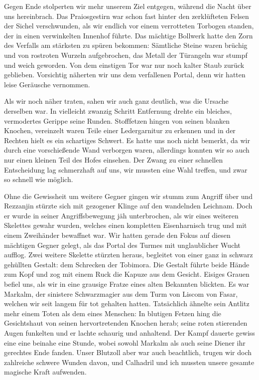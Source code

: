 Gegen Ende stolperten wir mehr unserem Ziel entgegen, während die Nacht über uns hereinbrach. Das Praiosgestirn war schon fast hinter den zerklüfteten Felsen der Sichel verschwunden, als wir endlich vor einem verrotteten Torbogen standen, der in einen verwinkelten Innenhof führte. Das mächtige Bollwerk hatte den Zorn des Verfalls am stärksten zu spüren bekommen: Sämtliche Steine waren brüchig und von rostroten Wurzeln aufgebrochen, das Metall der Türangeln war stumpf und weich geworden. Von dem einstigen Tor war nur noch kalter Staub zurück geblieben. Vorsichtig näherten wir uns dem verfallenen Portal, denn wir hatten leise Geräusche vernommen.\par

Als wir noch näher traten, sahen wir auch ganz deutlich, was die Ursache derselben war. In vielleicht zwanzig Schritt Entfernung drehte ein bleiches, vermodertes Gerippe seine Runden. Stofffetzen hingen von seinen blanken Knochen, vereinzelt waren Teile einer Ledergarnitur zu erkennen und in der Rechten hielt es ein schartiges Schwert. Es hatte uns noch nicht bemerkt, da wir durch eine vorschießende Wand verborgen waren, allerdings konnten wir so auch nur einen kleinen Teil des Hofes einsehen. Der Zwang zu einer schnellen Entscheidung lag schmerzhaft auf uns, wir mussten eine Wahl treffen, und zwar so schnell wie möglich. \par

Ohne die Gewissheit um weitere Gegner gingen wir stumm zum Angriff über und Rezzanjin stürzte sich mit gezogener Klinge auf den wandelnden Leichnam. Doch er wurde in seiner Angriffsbewegung jäh unterbrochen, als wir eines weiteren Skelettes gewahr wurden, welches einen kompletten Eisenharnisch trug und mit einem Zweihänder bewaffnet war. Wir hatten gerade den Fokus auf diesen mächtigen Gegner gelegt, als das Portal des Turmes mit unglaublicher Wucht aufflog. Zwei weitere Skelette stürzten heraus, begleitet von einer ganz in schwarz gehüllten Gestalt: dem Schrecken der Tobimora. Die Gestalt führte beide Hände zum Kopf und zog mit einem Ruck die Kapuze aus dem Gesicht. Eisiges Grauen befiel uns, als wir in eine grausige Fratze eines alten Bekannten blickten. Es war Markalm, der sinistere Schwarzmagier aus dem Turm von Liscom  von Fasar, welchen wir seit langem für tot gehalten hatten. Tatsächlich ähnelte sein Antlitz mehr einem Toten als dem eines Menschen: In blutigen Fetzen hing die Gesichtshaut von seinen hervortretenden Knochen herab; seine roten stierenden Augen funkelten und er lachte schaurig und anhaltend. Der Kampf dauerte gewiss eine eine beinahe eine Stunde, wobei sowohl Markalm als auch seine Diener ihr gerechtes Ende fanden. Unser Blutzoll aber war auch beachtlich, trugen wir doch zahlreiche schwere Wunden davon, und Calhadril und ich mussten unsere gesamte magische Kraft aufwenden. \par

